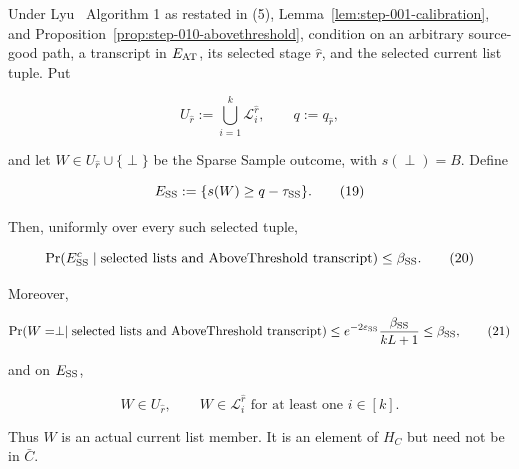 \begin{lemma}\label{lem:step-010-sparse-output}
Under Lyu~\citep{lyu2025} Algorithm 1 as restated in (5), Lemma~\ref{lem:step-001-calibration}, and
Proposition~\ref{prop:step-010-abovethreshold}, condition on an arbitrary
source-good path, a transcript in \(E_{\rm AT}\), its selected stage
\(\widehat r\), and the selected current list tuple. Put

\[
 U_{\widehat r}:=\bigcup_{i=1}^k\mathcal L_i^{\widehat r},
 \qquad q:=q_{\widehat r},
\]

and let \(W\in U_{\widehat r}\cup\{\perp\}\) be the Sparse Sample outcome,
with \(s(\perp)=B\). Define

\[
 E_{\rm SS}:=\{s(W)\geq q-\tau_{\rm SS}\}.
 \tag{19}
\]

Then, uniformly over every such selected tuple,

\[
 \Pr(E_{\rm SS}^c\mid
       \text{selected lists and AboveThreshold transcript})
 \leq\beta_{\rm SS}.
 \tag{20}
\]

Moreover,

\[
 \Pr(W=\perp\mid
       \text{selected lists and AboveThreshold transcript})
 \leq
 e^{-2\varepsilon_{\rm SS}}
 \frac{\beta_{\rm SS}}{kL+1}
 \leq\beta_{\rm SS},
 \tag{21}
\]

and on \(E_{\rm SS}\),

\[
 W\in U_{\widehat r},
 \qquad
 W\in\mathcal L_i^{\widehat r}
 \text{ for at least one }i\in[k].
 \tag{22}
\]

Thus \(W\) is an actual current list member. It is an element of \(H_C\)
but need not be in \(\bar C\).


\end{lemma}

